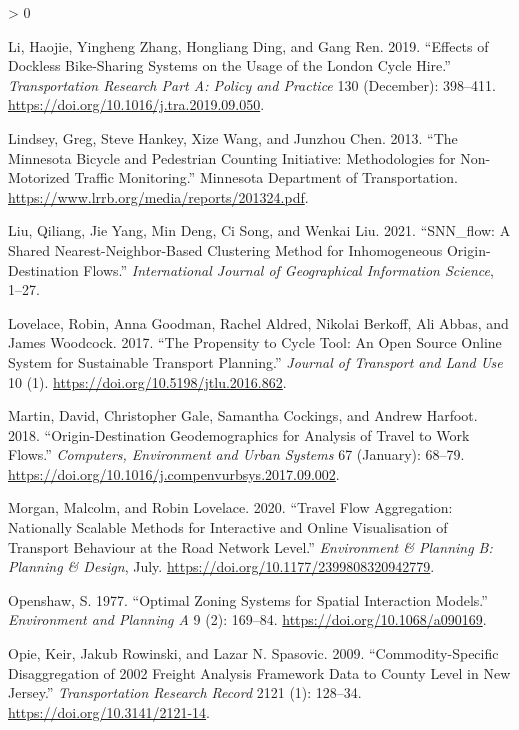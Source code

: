 \documentclass[
]{article}
\newlength{\cslhangindent}
\newenvironment{CSLReferences}[2] %
 {%
  \setlength{\parindent}{0pt}
  \ifodd #1 \everypar{\setlength{\hangindent}{\cslhangindent}}\ignorespaces\fi
  \ifnum #2 > 0
  \setlength{\parskip}{#2\baselineskip}
  \fi
 }%
 {}
\begin{document}
\begin{CSLReferences}{1}{0}
\leavevmode\hypertarget{ref-li_effects_2019}{}%
Li, Haojie, Yingheng Zhang, Hongliang Ding, and Gang Ren. 2019. {``Effects of Dockless Bike-Sharing Systems on the Usage of the {London Cycle Hire}.''} \emph{Transportation Research Part A: Policy and Practice} 130 (December): 398--411. \url{https://doi.org/10.1016/j.tra.2019.09.050}.

\leavevmode\hypertarget{ref-lindsey_minnesota_2013}{}%
Lindsey, Greg, Steve Hankey, Xize Wang, and Junzhou Chen. 2013. {``The {Minnesota} Bicycle and Pedestrian Counting Initiative: {Methodologies} for Non-Motorized Traffic Monitoring.''} {Minnesota Department of Transportation}. \url{https://www.lrrb.org/media/reports/201324.pdf}.

\leavevmode\hypertarget{ref-liu_snn_2021}{}%
Liu, Qiliang, Jie Yang, Min Deng, Ci Song, and Wenkai Liu. 2021. {``{SNN}\_flow: A Shared Nearest-Neighbor-Based Clustering Method for Inhomogeneous Origin-Destination Flows.''} \emph{International Journal of Geographical Information Science}, 1--27.

\leavevmode\hypertarget{ref-lovelace_propensity_2017}{}%
Lovelace, Robin, Anna Goodman, Rachel Aldred, Nikolai Berkoff, Ali Abbas, and James Woodcock. 2017. {``The {Propensity} to {Cycle Tool}: {An} Open Source Online System for Sustainable Transport Planning.''} \emph{Journal of Transport and Land Use} 10 (1). \url{https://doi.org/10.5198/jtlu.2016.862}.

\leavevmode\hypertarget{ref-martin_origindestination_2018}{}%
Martin, David, Christopher Gale, Samantha Cockings, and Andrew Harfoot. 2018. {``Origin-Destination Geodemographics for Analysis of Travel to Work Flows.''} \emph{Computers, Environment and Urban Systems} 67 (January): 68--79. \url{https://doi.org/10.1016/j.compenvurbsys.2017.09.002}.

\leavevmode\hypertarget{ref-morgan_travel_2020}{}%
Morgan, Malcolm, and Robin Lovelace. 2020. {``Travel Flow Aggregation: Nationally Scalable Methods for Interactive and Online Visualisation of Transport Behaviour at the Road Network Level.''} \emph{Environment \& Planning B: Planning \& Design}, July. \url{https://doi.org/10.1177/2399808320942779}.

\leavevmode\hypertarget{ref-openshaw_optimal_1977}{}%
Openshaw, S. 1977. {``Optimal Zoning Systems for Spatial Interaction Models.''} \emph{Environment and Planning A} 9 (2): 169--84. \url{https://doi.org/10.1068/a090169}.

\leavevmode\hypertarget{ref-opie_commodityspecific_2009}{}%
Opie, Keir, Jakub Rowinski, and Lazar N. Spasovic. 2009. {``Commodity-{Specific Disaggregation} of 2002 {Freight Analysis Framework Data} to {County Level} in {New Jersey}.''} \emph{Transportation Research Record} 2121 (1): 128--34. \url{https://doi.org/10.3141/2121-14}.


\end{CSLReferences}
\end{document}
